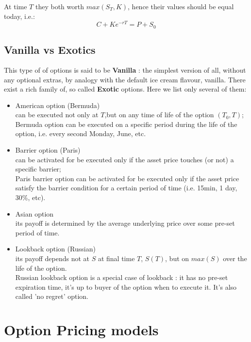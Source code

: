 \documentclass[a4paper]{report}
\begin{document}
\begin{itemize}
At time $T$ they both worth $max(S_T, K)$, hence their values should be equal today, i.e.:
\begin{equation}
C + Ke^{-rT} = P + S_0
\end{equation}

\subsection{Vanilla vs Exotics}


This type of of options is said to be \textbf{Vanilla} : the simplest version of all, without any optional extras, by analogy with the default ice cream flavour, vanilla. There exist a rich family of, so called \textbf{Exotic} options. Here we list only several of them:
\begin{itemize}
\item American option (Bermuda)
\\can be executed not only at $T$,but on any time of life of the option $(T_0,T)$;
\\Bermuda option can be executed on a specific period during the life of the option, i.e. every second Monday, June, etc.
\item Barrier option (Paris)
\\can be activated for be executed only if the asset price touches (or not) a specific barrier;
\\Paris barrier option can be activated for be executed only if the asset price satisfy the barrier condition for a certain period of time (i.e. 15min, 1 day, 30\%, etc).
\item Asian option
\\its payoff is determined by the average underlying price over some pre-set period of time.
\item Lookback option (Russian)
\\its payoff depends not at $S$ at final time $T$, $S(T)$, but on $max(S)$ over the life of the option.
\\Russian lookback option is a special case of lookback : it has no pre-set expiration time, it's up to buyer of the option when to execute it. It's also called 'no regret' option. 
\end{itemize}



\section{Option Pricing models}


\end{itemize}
\end{document}
